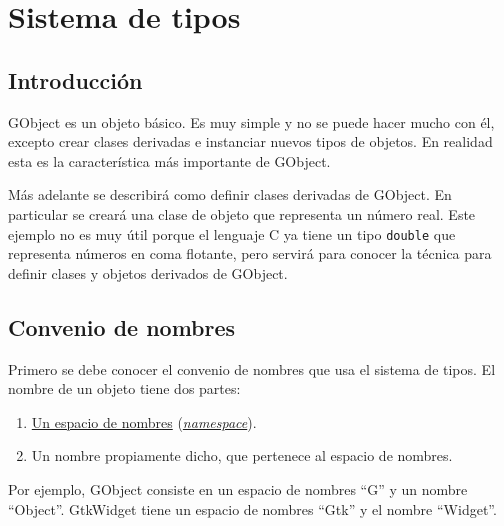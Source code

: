 %

\section{Sistema de tipos}
\subsection{Introducción}
\textsf{GObject} es un objeto básico. Es muy simple y no se puede hacer mucho con él, excepto crear
clases derivadas e instanciar nuevos tipos de objetos.
En realidad esta es la característica más importante de \textsf{GObject}.

Más adelante se describirá como definir clases derivadas de \textsf{GObject}.
En particular se creará una clase de objeto  que representa un número real.
Este ejemplo no es muy útil porque el lenguaje C ya tiene un tipo \texttt{double} que representa
números en coma flotante, pero servirá para conocer la técnica para definir clases y objetos derivados de \textsf{GObject}.

\subsection{Convenio de nombres}
Primero se debe conocer el convenio de nombres que usa el sistema de tipos.
El nombre de un objeto tiene dos partes:
\vspace{-\topsep}
\begin{enumerate}
  \tightlist
\item \href{https://es.wikipedia.org/wiki/Espacio_de_nombres}{\textsf{Un espacio de nombres}}
  (\href{https://en.wikipedia.org/wiki/Namespace}{\emph\textsf{{namespace}}}).
\item Un nombre propiamente dicho, que pertenece al espacio de nombres.
\end{enumerate}

Por ejemplo, \textsf{GObject} consiste en un espacio de nombres ``\textsf{G}'' y un nombre ``\textsf{Object}''.
\textsf{GtkWidget} tiene un espacio de nombres ``\textsf{Gtk}'' y el nombre ``\textsf{Widget}''.

